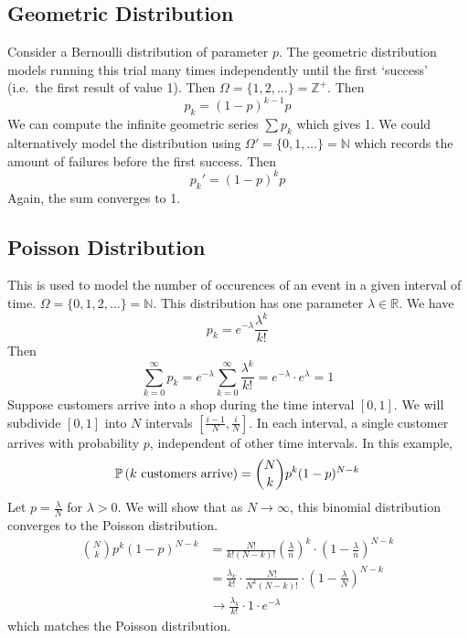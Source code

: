 \subsection{Geometric Distribution}
Consider a Bernoulli distribution of parameter \(p\).
The geometric distribution models running this trial many times independently until the first `success' (i.e.\ the first result of value 1).
Then \(\Omega = \{ 1, 2, \dots \} = \mathbb Z^+\).
Then
\[
	p_k = (1-p)^{k-1}p
\]
We can compute the infinite geometric series \(\sum p_k\) which gives 1.
We could alternatively model the distribution using \(\Omega' = \{ 0, 1, \dots \} = \mathbb N\) which records the amount of failures before the first success.
Then
\[
	p_k' = (1-p)^k p
\]
Again, the sum converges to 1.

\subsection{Poisson Distribution}
This is used to model the number of occurences of an event in a given interval of time.
\(\Omega = \{ 0, 1, 2, \dots \} = \mathbb N\).
This distribution has one parameter \(\lambda \in \mathbb R\).
We have
\[
	p_k = e^{-\lambda} \frac{\lambda^k}{k!}
\]
Then
\[
	\sum_{k=0}^\infty p_k = e^{-\lambda}  \sum_{k=0}^\infty \frac{\lambda^k}{k!} = e^{-\lambda} \cdot e^{\lambda} = 1
\]
Suppose customers arrive into a shop during the time interval \([0, 1]\).
We will subdivide \([0, 1]\) into \(N\) intervals \(\left[ \frac{i-1}{N}, \frac{i}{N} \right]\).
In each interval, a single customer arrives with probability \(p\), independent of other time intervals.
In this example,
\[
	\mathbb{P}\left({k \text{ customers arrive}}\right) = \binom{N}{k} p^k (1-p)^{N-k}
\]
Let \(p = \frac{\lambda}{N}\) for \(\lambda > 0\).
We will show that as \(N \to \infty\), this binomial distribution converges to the Poisson distribution.
\begin{align*}
	\binom{N}{k} p^k (1-p)^{N-k} & = \frac{N!}{k!(N-k)!} \left( \frac{\lambda}{n} \right)^k \cdot \left( 1 - \frac{\lambda}{n} \right)^{N-k} \\
	                             & = \frac{\lambda_k}{k!} \cdot \frac{N!}{N^k(N-k)!} \cdot \left( 1 - \frac{\lambda}{N} \right)^{N-k}        \\
	                             & \to \frac{\lambda_k}{k!} \cdot 1 \cdot e^{-\lambda}
\end{align*}
which matches the Poisson distribution.

